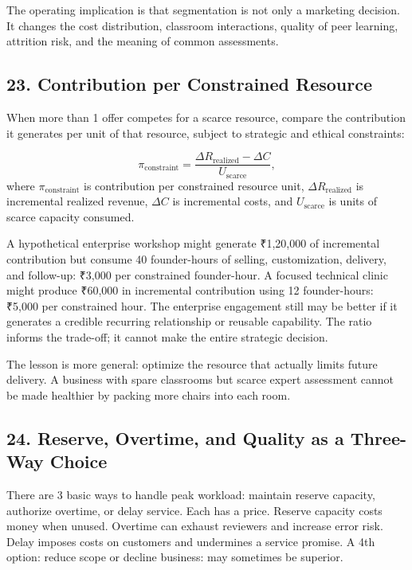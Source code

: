 The operating implication is that segmentation is not only a marketing decision. It changes the cost distribution, classroom interactions, quality of peer learning, attrition risk, and the meaning of common assessments.

\subsection*{23. Contribution per Constrained Resource}

When more than 1 offer competes for a scarce resource, compare the contribution it generates per unit of that resource, subject to strategic and ethical constraints:

\begin{equation}
\pi_{\text{constraint}} = \frac{\Delta R_{\text{realized}} - \Delta C}{U_{\text{scarce}}},
\end{equation}
where $\pi_{\text{constraint}}$ is contribution per constrained resource unit, $\Delta R_{\text{realized}}$ is incremental realized revenue, $\Delta C$ is incremental costs, and $U_{\text{scarce}}$ is units of scarce capacity consumed.

A hypothetical enterprise workshop might generate ₹1,20,000 of incremental contribution but consume 40 founder-hours of selling, customization, delivery, and follow-up: ₹3,000 per constrained founder-hour. A focused technical clinic might produce ₹60,000 in incremental contribution using 12 founder-hours: ₹5,000 per constrained hour. The enterprise engagement still may be better if it generates a credible recurring relationship or reusable capability. The ratio informs the trade-off; it cannot make the entire strategic decision.

The lesson is more general: optimize the resource that actually limits future delivery. A business with spare classrooms but scarce expert assessment cannot be made healthier by packing more chairs into each room.

\subsection*{24. Reserve, Overtime, and Quality as a Three-Way Choice}

There are 3 basic ways to handle peak workload: maintain reserve capacity, authorize overtime, or delay service. Each has a price. Reserve capacity costs money when unused. Overtime can exhaust reviewers and increase error risk. Delay imposes costs on customers and undermines a service promise. A 4th option: reduce scope or decline business: may sometimes be superior.

